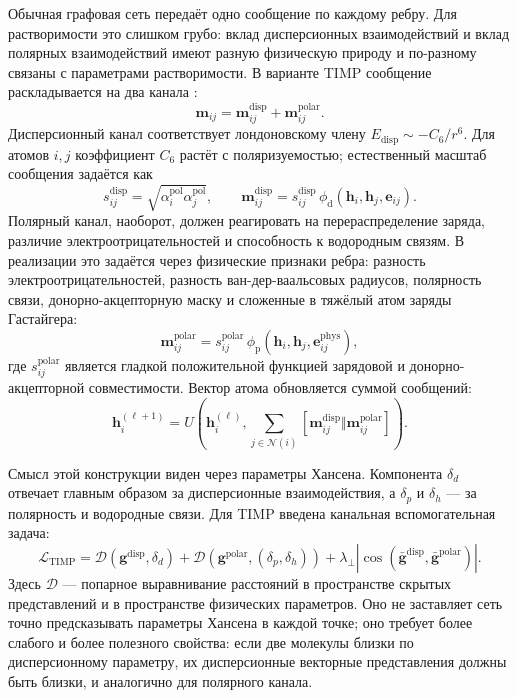 \documentclass[11pt]{article}
\theoremstyle{definition}
\begin{document}
Обычная графовая сеть передаёт одно сообщение по каждому ребру. Для растворимости это слишком грубо: вклад дисперсионных взаимодействий и вклад полярных взаимодействий имеют разную физическую природу и по-разному связаны с параметрами растворимости. В варианте TIMP сообщение раскладывается на два канала \cite{gilmer2017,gasteiger2020,hansen2007}:
\begin{equation*}
    \mathbf m_{ij}
    =
    \mathbf m_{ij}^{\mathrm{disp}}
    +
    \mathbf m_{ij}^{\mathrm{polar}} .
\end{equation*}
Дисперсионный канал соответствует лондоновскому члену $E_{\mathrm{disp}}\sim-C_6/r^6$. Для атомов $i,j$ коэффициент $C_6$ растёт с поляризуемостью; естественный масштаб сообщения задаётся как
\begin{equation*}
    s_{ij}^{\mathrm{disp}}
    =\sqrt{\alpha_i^{\mathrm{pol}}\alpha_j^{\mathrm{pol}}},
    \qquad
    \mathbf m_{ij}^{\mathrm{disp}}
    =s_{ij}^{\mathrm{disp}}\,\phi_{\mathrm d}
    (\mathbf h_i,\mathbf h_j,\mathbf e_{ij}).
\end{equation*}
Полярный канал, наоборот, должен реагировать на перераспределение заряда, различие электроотрицательностей и способность к водородным связям. В реализации это задаётся через физические признаки ребра: разность электроотрицательностей, разность ван-дер-ваальсовых радиусов, полярность связи, донорно-акцепторную маску и сложенные в тяжёлый атом заряды Гастайгера:
\begin{equation*}
    \mathbf m_{ij}^{\mathrm{polar}}
    =s_{ij}^{\mathrm{polar}}\,\phi_{\mathrm p}
    (\mathbf h_i,\mathbf h_j,\mathbf e_{ij}^{\mathrm{phys}}),
\end{equation*}
где $s_{ij}^{\mathrm{polar}}$ является гладкой положительной функцией зарядовой и донорно-акцепторной совместимости. Вектор атома обновляется суммой сообщений:
\begin{equation*}
    \mathbf h_i^{(\ell+1)}
    =U\!\left(
    \mathbf h_i^{(\ell)},
    \sum_{j\in\mathcal N(i)}
    [\mathbf m_{ij}^{\mathrm{disp}}\Vert \mathbf m_{ij}^{\mathrm{polar}}]
    \right).
\end{equation*}

Смысл этой конструкции виден через параметры Хансена. Компонента $\delta_d$ отвечает главным образом за дисперсионные взаимодействия, а $\delta_p$ и $\delta_h$ --- за полярность и водородные связи. Для TIMP введена канальная вспомогательная задача:
\begin{equation*}
    \mathcal L_{\mathrm{TIMP}}
    =
    \mathcal D(\mathbf g^{\mathrm{disp}},\delta_d)
    +
    \mathcal D(\mathbf g^{\mathrm{polar}},(\delta_p,\delta_h))
    +
    \lambda_{\perp}
    \left|
    \cos(\bar{\mathbf g}^{\mathrm{disp}},\bar{\mathbf g}^{\mathrm{polar}})
    \right| .
\end{equation*}
Здесь $\mathcal D$ --- попарное выравнивание расстояний в пространстве скрытых представлений и в пространстве физических параметров. Оно не заставляет сеть точно предсказывать параметры Хансена в каждой точке; оно требует более слабого и более полезного свойства: если две молекулы близки по дисперсионному параметру, их дисперсионные векторные представления должны быть близки, и аналогично для полярного канала.
\end{document}
